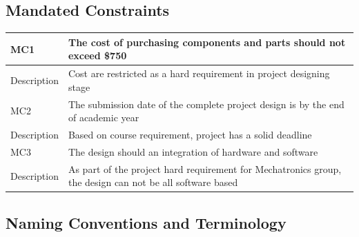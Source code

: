 \documentclass[12pt]{article}
\begin{document}
\subsection{Mandated Constraints}
\begin{center}
    \begin{tabular}{|| p{3cm} || p{8cm} ||}
    \hline
    MC1 & The cost of purchasing components and parts should not exceed \$750  \\
    \hline
    Description & Cost are restricted as a hard requirement in project designing stage \\
    \hline\hline
    MC2  & The submission date of the complete project design is by the end of academic year\\
    \hline
    Description & Based on course requirement, project has a solid deadline\\
    \hline\hline
    MC3 & The design should an integration of hardware and software\\
    \hline
    Description & As part of the project hard requirement for Mechatronics group, the design can not be all software based \\
    \hline\hline
    \end{tabular}
\end{center}
\subsection{Naming Conventions and Terminology}
\end{document}
